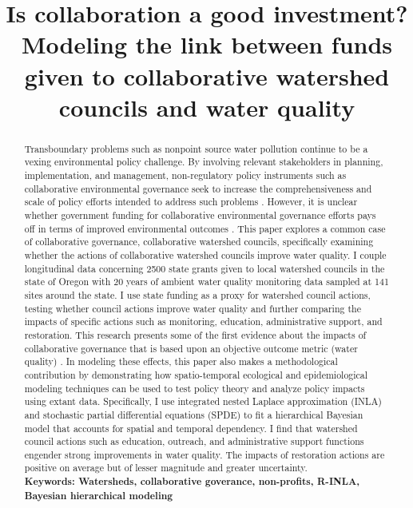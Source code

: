 \documentclass[12pt,a4paper,titlepage]{article}
\title{Is collaboration a good investment? Modeling the link between funds given to collaborative watershed councils and water quality}
\begin{document}
\maketitle

\begin{abstract}


Transboundary problems such as nonpoint source water pollution continue to be a vexing environmental policy challenge. By involving relevant stakeholders in planning, implementation, and management, non-regulatory policy instruments such as collaborative environmental governance seek to increase the comprehensiveness and scale of policy efforts intended to address such problems \parencite{margerum2011}. However, it is unclear whether government funding for collaborative environmental governance efforts pays off in terms of improved environmental outcomes \parencite{thomas2011}. This paper explores a common case of collaborative governance, collaborative watershed councils, specifically examining whether the actions of collaborative watershed councils improve water quality. I couple longitudinal data concerning 2500 state grants given to local watershed councils in the state of Oregon with 20 years of ambient water quality monitoring data sampled at 141 sites around the state. I use state funding as a proxy for watershed council actions, testing whether council actions improve water quality and further comparing the impacts of specific actions such as monitoring, education, administrative support, and restoration. This research presents some of the first evidence about the impacts of collaborative governance that is based upon an objective outcome metric (water quality) \parencite{carr2012,koontz2006}. In modeling these effects, this paper also makes a methodological contribution by demonstrating how spatio-temporal ecological and epidemiological modeling techniques can be used to test policy theory and analyze policy impacts using extant data. Specifically, I use integrated nested Laplace approximation (INLA) \parencite{rue2009} and stochastic partial differential equations (SPDE) \parencite{lindgren2011} to fit a hierarchical Bayesian model that accounts for spatial and temporal dependency. I find that watershed council actions such as education, outreach, and administrative support functions engender strong improvements in water quality. The impacts of restoration actions are positive on average but of lesser magnitude and greater uncertainty.\\

\noindent
\bf{Keywords}: Watersheds, collaborative goverance, non-profits, R-INLA, Bayesian hierarchical modeling
\end{abstract}
\end{document}
